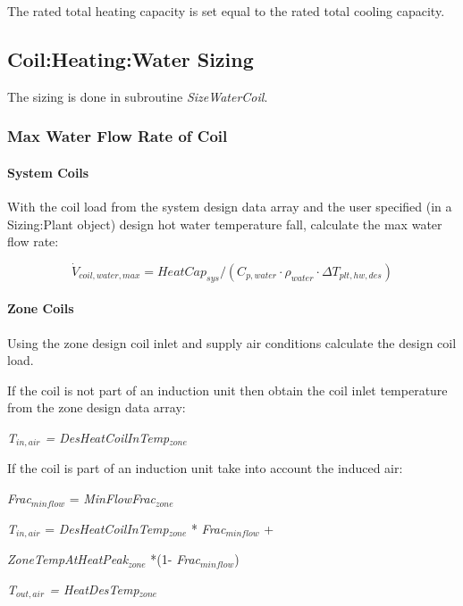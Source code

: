 The rated total heating capacity is set equal to the rated total cooling capacity.

\subsection{Coil:Heating:Water Sizing}\label{coilheatingwater-sizing}

The sizing is done in subroutine \emph{SizeWaterCoil}.

\subsubsection{Max Water Flow Rate of Coil}\label{max-water-flow-rate-of-coil-1}

\paragraph{System Coils}\label{system-coils}

With the coil load from the system design data array and the user specified (in a Sizing:Plant object) design hot water temperature fall, calculate the max water flow rate:

\begin{equation}
\dot V_{coil,water,max} = HeatCap_{sys}/(C_{p,water} \cdot \rho_{water} \cdot \Delta T_{plt,hw,des})
\end{equation}

\paragraph{Zone Coils}\label{zone-coils}

Using the zone design coil inlet and supply air conditions calculate the design coil load.

If the coil is not part of an induction unit then obtain the coil inlet temperature from the zone design data array:

\emph{T\(_{in,air}\) = DesHeatCoilInTemp\(_{zone}\)}

If the coil is part of an induction unit take into account the induced air:

\emph{Frac\(_{minflow}\)} = \emph{MinFlowFrac\(_{zone}\)}

\emph{T\(_{in,air}\)} = \emph{DesHeatCoilInTemp\(_{zone}\)} * \emph{Frac\(_{minflow}\)} +

\emph{ZoneTempAtHeatPeak\(_{zone}\)} *(1- \emph{Frac\(_{minflow}\)})

\emph{T\(_{out,air}\) = HeatDesTemp\(_{zone}\)}


